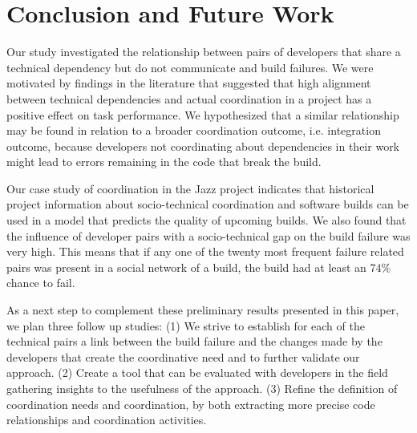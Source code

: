 \documentclass[conference]{IEEEtran}
\begin{document}
\section{Conclusion and Future Work}
Our study investigated the relationship between pairs of developers that share
a technical dependency but do not communicate and build failures. We were
motivated by findings in the literature that suggested that high alignment between technical dependencies and actual coordination in a project has a positive effect on task
performance.
We hypothesized that a similar relationship may be found in relation to a broader
coordination outcome, i.e. integration outcome, because developers not
coordinating about dependencies in their work might lead to errors remaining in
the code that break the build.

Our case study of coordination in the Jazz project indicates that 
historical project information about socio-technical coordination and software
builds can be used in a model that predicts the quality of upcoming builds. We also found
that the influence of developer pairs with a socio-technical gap on the build
failure was very high. This means that if any one of the twenty most frequent failure related pairs was present in a social network of a build, the build had at least an 74\% chance to fail.

As a next step to complement these preliminary results presented in this paper, we plan three follow up studies:
(1) We strive to establish for each of the technical pairs a link between the build failure and the changes made by the developers that create the coordinative need and to further validate our approach.
(2) Create a tool that can be evaluated with developers in the field gathering insights to the usefulness of the approach.
(3) Refine the definition of coordination needs and coordination, by both extracting more precise code relationships and coordination activities.



\end{document}
